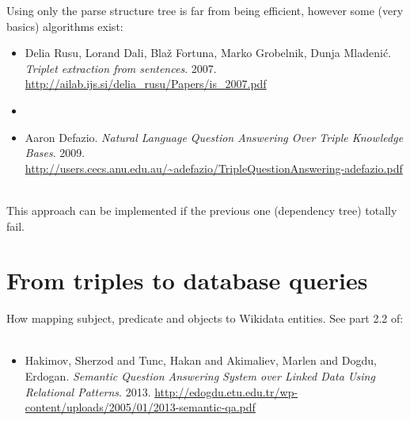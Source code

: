 \documentclass[a4paper,10pt]{article} %
\begin{document}
Using only the parse structure tree is far from being efficient, however some (very basics) algorithms exist:
~\\
\begin{itemize}
	\item[] Delia Rusu, Lorand Dali, Blaž Fortuna, Marko Grobelnik, Dunja Mladenić. \emph{Triplet extraction from sentences}. 2007. \url{http://ailab.ijs.si/delia_rusu/Papers/is_2007.pdf}
  \item[]
	\item[] Aaron Defazio. \emph{Natural Language Question Answering Over Triple Knowledge Bases}. 2009. \url{http://users.cecs.anu.edu.au/~adefazio/TripleQuestionAnswering-adefazio.pdf}
\end{itemize}

~\\
This approach can be implemented if the previous one (dependency tree) totally fail.

\section{From triples to database queries}

How mapping subject, predicate and objects to Wikidata entities. See part 2.2 of: 
~\\
\begin{itemize}
	\item[] Hakimov, Sherzod and Tunc, Hakan and Akimaliev, Marlen and Dogdu, Erdogan. \emph{Semantic Question Answering System over Linked Data Using Relational Patterns}. 2013. \url{http://edogdu.etu.edu.tr/wp-content/uploads/2005/01/2013-semantic-qa.pdf}
\end{itemize}


\end{document}
